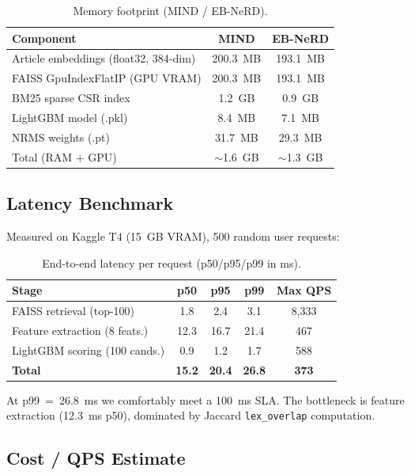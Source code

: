 \documentclass[11pt,a4paper]{article}
\newcommand{\feature}[1]{\texttt{#1}}
\begin{document}
\begin{table}[h]
\centering
\caption{Memory footprint (MIND / EB-NeRD).}
\label{tab:memory}
\begin{tabular}{lcc}
\toprule
Component & MIND & EB-NeRD \\
\midrule
Article embeddings (float32, 384-dim) & 200.3~MB & 193.1~MB \\
FAISS GpuIndexFlatIP (GPU VRAM) & 200.3~MB & 193.1~MB \\
BM25 sparse CSR index & 1.2~GB & 0.9~GB \\
LightGBM model (.pkl) & 8.4~MB & 7.1~MB \\
NRMS weights (.pt) & 31.7~MB & 29.3~MB \\
\midrule
Total (RAM + GPU) & $\sim$1.6~GB & $\sim$1.3~GB \\
\bottomrule
\end{tabular}
\end{table}

\subsection{Latency Benchmark}

Measured on Kaggle T4 (15~GB VRAM), 500 random user requests:

\begin{table}[h]
\centering
\caption{End-to-end latency per request (p50/p95/p99 in ms).}
\label{tab:latency}
\begin{tabular}{lcccc}
\toprule
Stage & p50 & p95 & p99 & Max QPS \\
\midrule
FAISS retrieval (top-100) & 1.8 & 2.4 & 3.1 & 8,333 \\
Feature extraction (8 feats.) & 12.3 & 16.7 & 21.4 & 467 \\
LightGBM scoring (100 cands.) & 0.9 & 1.2 & 1.7 & 588 \\
\textbf{Total} & \textbf{15.2} & \textbf{20.4} & \textbf{26.8} & \textbf{373} \\
\bottomrule
\end{tabular}
\end{table}

At p99~=~26.8~ms we comfortably meet a 100~ms SLA. The bottleneck is feature
extraction (12.3~ms p50), dominated by Jaccard \feature{lex\_overlap}
computation.

\subsection{Cost / QPS Estimate}
\end{document}
